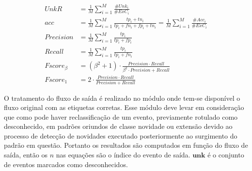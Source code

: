 \begin{align}
  \mathit{UnkR}       &= \frac{1}{M} \sum_{i=1}^{M} \frac{\#Unk_i}{\#ExC_i}\\
  \mathit{acc}        &= \frac{1}{M} \sum_{i=1}^{M} \frac{tp_i + tn_i}{tp_i+fn_i+fp_i+tn_i}
  = \frac{1}{M} \sum_{i=1}^{M} \frac{\#Acc_i}{\#ExC_i}\\
  \mathit{Precision}  &= \frac{1}{M} \sum_{i=1}^{M} \frac{tp_i}{tp_i+fp_i} \\
  \mathit{Recall}     &= \frac{1}{M} \sum_{i=1}^{M} \frac{tp_i}{tp_i+fn_i} \\
  \mathit{Fscore}_\beta &= (\beta^2 +1) \cdot
  \frac{
  \mathit{Precision} \cdot \mathit{Recall}
  }{
    \beta^2 \cdot \mathit{Precision} +\mathit{Recall}
  }\\
  \mathit{Fscore}_1   &= 2 \cdot \frac{
    \mathit{Precision} \cdot \mathit{Recall}
    }{
      \mathit{Precision} +\mathit{Recall}
    } 
\end{align}





O tratamento do fluxo de saída é realizado no módulo \sink onde tem-se
disponível o fluxo original com as etiquetas corretas.
Esse módulo deve levar em consideração que
como pode haver reclassificação de um evento, previamente rotulado como
desconhecido, em padrões oriundos de classe novidade ou extensão devido ao
processo de detecção de novidades executado posteriormente ao surgimento
do padrão em questão.
Portanto os resultados são computados em função do fluxo de saída, então os $n$ nas
equações são o índice do evento de saída.
$\mathbf{unk}$ é o conjunto de eventos marcados como desconhecidos.




